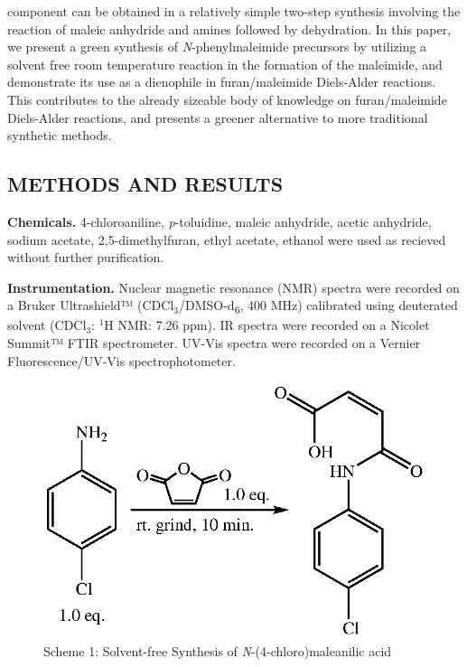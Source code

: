 \documentclass[11pt]{article}
\let\bf\textbf
\begin{document}
component can be obtained in a relatively simple two-step synthesis involving the reaction of maleic anhydride and amines followed by dehydration.\cite{Briou2021} In this paper, we present a green synthesis of \textit{N}-phenylmaleimide precursors by utilizing a solvent free room temperature reaction in the formation of the maleimide, and demonstrate its use as a dienophile in furan/maleimide Diels-Alder reactions. This contributes to the already sizeable body of knowledge on furan/maleimide Diels-Alder reactions, and presents a greener alternative to more traditional synthetic methods. 

\subsection*{METHODS AND RESULTS}
\bf{Chemicals.} 4-chloroaniline, \textit{p}-toluidine, maleic anhydride, acetic anhydride, sodium acetate, 2,5-dimethylfuran, ethyl acetate, ethanol were used as recieved without further purification.

\bf{Instrumentation.} Nuclear magnetic resonance (NMR) spectra were recorded on a Bruker Ultrashield™ (CDCl$_3$/DMSO-d\textsubscript{6}, 400 MHz) calibrated using deuterated solvent (CDCl$_3$: $^1$H NMR: 7.26 ppm). IR spectra were recorded on a Nicolet Summit™ FTIR spectrometer. UV-Vis spectra were recorded on a Vernier Fluorescence/UV-Vis spectrophotometer.

\begin{figure}[H]
    \centering
    \includegraphics[scale=0.8]{schemes/scheme1.eps}
    \caption*{Scheme 1: Solvent-free Synthesis of \textit{N}-(4-chloro)maleanilic acid}
\end{figure}
\end{document}
